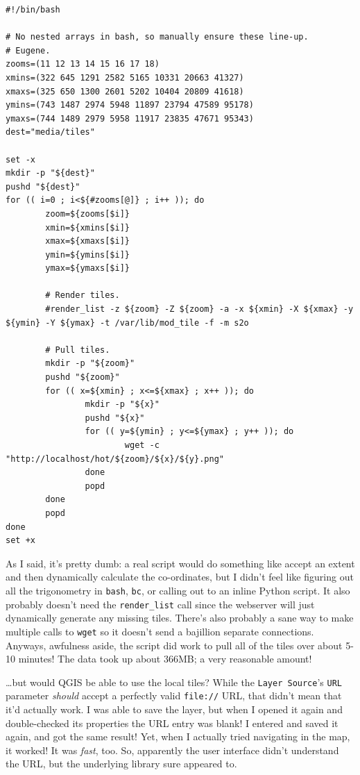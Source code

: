 \documentclass{article}
\begin{document}
\begin{verbatim}
#!/bin/bash

# No nested arrays in bash, so manually ensure these line-up.
# Eugene.
zooms=(11 12 13 14 15 16 17 18)
xmins=(322 645 1291 2582 5165 10331 20663 41327)
xmaxs=(325 650 1300 2601 5202 10404 20809 41618)
ymins=(743 1487 2974 5948 11897 23794 47589 95178)
ymaxs=(744 1489 2979 5958 11917 23835 47671 95343)
dest="media/tiles"

set -x
mkdir -p "${dest}"
pushd "${dest}"
for (( i=0 ; i<${#zooms[@]} ; i++ )); do
        zoom=${zooms[$i]}
        xmin=${xmins[$i]}
        xmax=${xmaxs[$i]}
        ymin=${ymins[$i]}
        ymax=${ymaxs[$i]}

        # Render tiles.
        #render_list -z ${zoom} -Z ${zoom} -a -x ${xmin} -X ${xmax} -y ${ymin} -Y ${ymax} -t /var/lib/mod_tile -f -m s2o

        # Pull tiles.
        mkdir -p "${zoom}"
        pushd "${zoom}"
        for (( x=${xmin} ; x<=${xmax} ; x++ )); do
                mkdir -p "${x}"
                pushd "${x}"
                for (( y=${ymin} ; y<=${ymax} ; y++ )); do
                        wget -c "http://localhost/hot/${zoom}/${x}/${y}.png"
                done
                popd
        done
        popd
done
set +x
\end{verbatim}

As I said, it's pretty dumb: a real script would do something like accept an extent and then dynamically calculate the co-ordinates, but I didn't feel like figuring out all the trigonometry in \texttt{bash}, \texttt{bc}, or calling out to an inline Python script.  It also probably doesn't need the \texttt{render_list} call since the webserver will just dynamically generate any missing tiles.  There's also probably a sane way to make multiple calls to \texttt{wget} so it doesn't send a bajillion separate connections.  Anyways, awfulness aside, the script did work to pull all of the tiles over about 5-10 minutes!  The data took up about 366MB; a very reasonable amount!

\ldots but would QGIS be able to use the local tiles?  While the \texttt{Layer Source}'s \texttt{URL} parameter \emph{should} accept a perfectly valid \texttt{file://} URL, that didn't mean that it'd actually work.  I was able to save the layer, but when I opened it again and double-checked its properties the URL entry was blank!  I entered and saved it again, and got the same result!  Yet, when I actually tried navigating in the map, it worked!  It was \emph{fast}, too.  So, apparently the user interface didn't understand the URL, but the underlying library sure appeared to.
\end{document}
